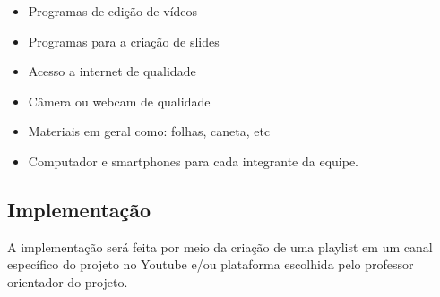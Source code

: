 \documentclass[a4paper,10pt]{article} %
\begin{document}
\begin{itemize}
 \item Programas de edição de vídeos 
 \item Programas para a criação de slides
 \item Acesso a internet de qualidade
 \item Câmera ou webcam de qualidade
 \item Materiais em geral como: folhas, caneta, etc
 \item Computador e smartphones para cada integrante da equipe.
\end{itemize}

\subsection{Implementação}
 A implementação será feita por meio da criação de uma playlist em um canal específico do projeto no Youtube e/ou plataforma escolhida pelo professor orientador do projeto.



\end{document}
